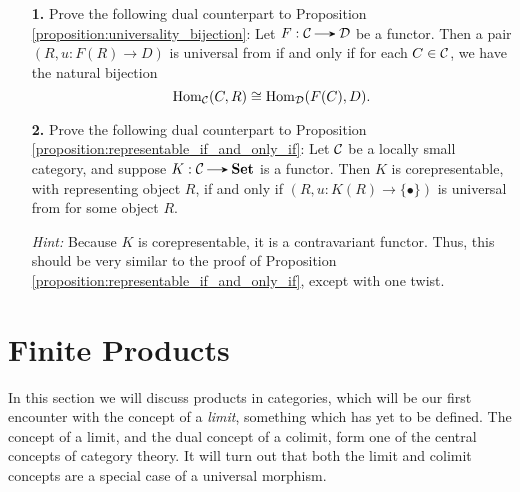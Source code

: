     \begin{itemize}
        \item[\textbf{1.}]\label{exercise:universality_bijection} 
        Prove the following dual counterpart to Proposition \ref{proposition:universality_bijection}: 
        Let $F: \cc \to \dd$ be a functor. Then a pair $(R, u: F(R) \to D)$ 
        is universal from  if and only if for each $C \in \mathcal{C}$, we have the 
        natural bijection 
        \[
            \operatorname{\mathrm{Hom}}_{\mathcal{C}}(C, R) \cong \operatorname{\mathrm{Hom}}_{\mathcal{D}}(F(C), D).
        \]

        \item[\textbf{2.}]\label{exercise:representable_if_and_only_if} 
        Prove the following dual counterpart to Proposition \ref{proposition:representable_if_and_only_if}:
        Let $\mathcal{C}$ be a locally small category, and suppose $K: \cc \to \textbf{Set}$ 
        is a functor. Then $K$ is corepresentable, with representing object $R$, if and only if 
        $(R, u: K(R) \to \{\bullet\})$
        is universal from  for some object $R$. 

        \emph{Hint:} Because $K$ is corepresentable, it is a contravariant functor. Thus, this 
        should be very similar to the proof of Proposition \ref{proposition:representable_if_and_only_if}, 
        except with one twist.
    \end{itemize}

    \newpage
    \section{Finite Products}
    In this section we will discuss products in categories, which will be 
    our first  encounter with  the 
    concept of a \emph{limit}, something which has 
    yet to be defined. The concept of a limit, and the dual concept of a 
    colimit, form one of the central concepts of category theory. It will turn out that both 
    the limit and colimit concepts are a special case of a universal morphism.
    


